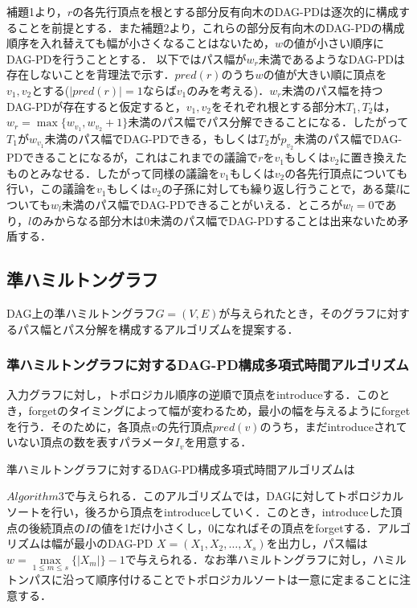 \documentclass{kuisthesis}           %
\begin{document}
 補題1より，$r$の各先行頂点を根とする部分反有向木のDAG-PDは逐次的に構成することを前提とする．また補題2より，これらの部分反有向木のDAG-PDの構成順序を入れ替えても幅が小さくなることはないため，$w$の値が小さい順序にDAG-PDを行うこととする．
 以下ではパス幅が$w_r$未満であるようなDAG-PDは存在しないことを背理法で示す．$pred(r)$のうち$w$の値が大きい順に頂点を$v_1, v_2$とする($|pred(r)|=1$ならば$v_1$のみを考える)．$w_r$未満のパス幅を持つDAG-PDが存在すると仮定すると，$v_1, v_2$をそれぞれ根とする部分木$T_1, T_2$は，$w_r= \max\{w_{v_1}, w_{v_2}+1\}$未満のパス幅でパス分解できることになる．したがって$T_1$が$w_{v_1}$未満のパス幅でDAG-PDできる，もしくは$T_2$が$p_{v_2}$未満のパス幅でDAG-PDできることになるが，これはこれまでの議論で$r$を$v_1$もしくは$v_2$に置き換えたものとみなせる．したがって同様の議論を$v_1$もしくは$v_2$の各先行頂点についても行い，この議論を$v_1$もしくは$v_2$の子孫に対しても繰り返し行うことで，ある葉$l$についても$w_l$未満のパス幅でDAG-PDできることがいえる．ところが$w_l=0$であり，$l$のみからなる部分木は0未満のパス幅でDAG-PDすることは出来ないため矛盾する．

 
 \subsection{準ハミルトングラフ}
DAG上の準ハミルトングラフ$G=(V, E)$が与えられたとき，そのグラフに対するパス幅とパス分解を構成するアルゴリズムを提案する．

 \subsubsection{準ハミルトングラフに対するDAG-PD構成多項式時間アルゴリズム}

 入力グラフに対し，トポロジカル順序の逆順で頂点をintroduceする．このとき，forgetのタイミングによって幅が変わるため，最小の幅を与えるようにforgetを行う．そのために，各頂点$v$の先行頂点$pred(v)$のうち，まだintroduceされていない頂点の数を表すパラメータ$I_v$を用意する．

 準ハミルトングラフに対するDAG-PD構成多項式時間アルゴリズムは\par \noindent $Algorithm 3$で与えられる．このアルゴリズムでは，DAGに対してトポロジカルソートを行い，後ろから頂点をintroduceしていく．このとき，introduceした頂点の後続頂点の$I$の値を1だけ小さくし，0になればその頂点をforgetする．アルゴリズムは幅が最小のDAG-PD $X=(X_1, X_2,   \ldots, X_s)$を出力し，パス幅は$w= \underset{1 \leq m \leq s}{\max}\{|X_m|\}-1$で与えられる．なお準ハミルトングラフに対し，ハミルトンパスに沿って順序付けることでトポロジカルソートは一意に定まることに注意する．
\end{document}

